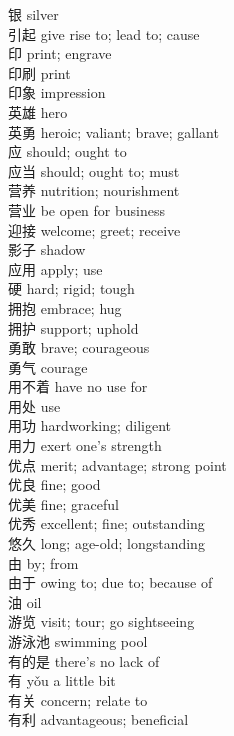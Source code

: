 银 \quad silver\\
引起 \quad give rise to; lead to; cause\\
印 \quad print; engrave\\
印刷 \quad print\\
印象 \quad impression\\
英雄 \quad hero\\
英勇 \quad heroic; valiant; brave; gallant\\
应 \quad should; ought to\\
应当 \quad should; ought to; must\\
营养 \quad nutrition; nourishment\\
营业 \quad be open for business\\
迎接 \quad welcome; greet; receive\\
影子 \quad shadow\\
应用 \quad apply; use\\
硬 \quad hard; rigid; tough\\
拥抱 \quad embrace; hug\\
拥护 \quad support; uphold\\
勇敢 \quad brave; courageous\\
勇气 \quad courage\\
用不着 \quad have no use for\\
用处 \quad use\\
用功 \quad hardworking; diligent\\
用力 \quad exert one's strength\\
优点 \quad merit; advantage; strong point\\
优良 \quad fine; good\\
优美 \quad fine; graceful\\
优秀 \quad excellent; fine; outstanding\\
悠久 \quad long; age-old; longstanding\\
由 \quad by; from\\
由于 \quad owing to; due to; because of\\
油 \quad oil\\
游览 \quad visit; tour; go sightseeing\\
游泳池 \quad swimming pool\\
有的是 \quad there's no lack of\\
有 \quad yǒu \quad a little bit\\
有关 \quad concern; relate to\\
有利 \quad advantageous; beneficial\\
